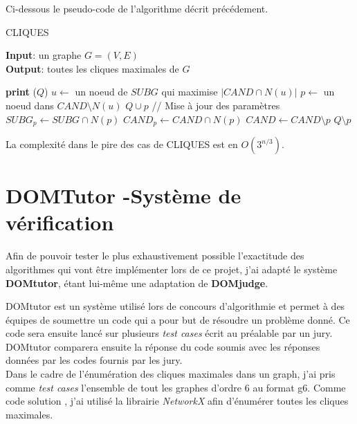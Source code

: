 \documentclass[a4paper, 12pt]{article}
\begin{document}
Ci-dessous le pseudo-code de l'algorithme décrit précédement.
\begin{algorithm}
  \caption{CLIQUES}
  \textbf{Input}: un graphe $G = (V,E)$\\
  \textbf{Output}: toutes les cliques maximales de $G$
  \begin{algorithmic}[1]
       
        \State \textbf{print} ($ Q $)
      \Else
        \State $u \gets$ un noeud de $SUBG$ qui maximise $|CAND \cap N(u)|$
          \State $p \gets$ un noeud dans $CAND \setminus N(u)$
          \State $ Q \cup p $ 
          \State // Mise à jour des paramètres
          \State $SUBG_p \gets SUBG \cap N(p)$
          \State $CAND_p \gets CAND \cap N(p)$
          \State {}
          \State $CAND \gets CAND \setminus {p}$
          \State $ Q \setminus p $ 
        \EndWhile
      \EndIf
    \EndProcedure
    \State {}
  \end{algorithmic}
\end{algorithm}

La complexité dans le pire des cas de CLIQUES est en $ O(3^{n/3}) $.

\section{DOMTutor -Système de vérification}

Afin de pouvoir tester le plus exhaustivement possible l'exactitude des algorithmes qui vont être implémenter lors de ce projet, j'ai adapté le système \textbf{DOMtutor}\cite{domtutor}, étant lui-même une adaptation de \textbf{DOMjudge}\cite{domjudge}.

DOMtutor est un système utilisé lors de concours d'algorithmie et permet à des équipes de soumettre un code qui a pour but de résoudre un problème donné. Ce code sera ensuite lancé sur plusieurs \textit{test cases} écrit au préalable par un jury. DOMtutor comparera ensuite la réponse du code soumis avec les réponses données par les codes fournis par les jury. \\

Dans le cadre de l'énumération des cliques maximales dans un graph, j'ai pris comme \textit{test cases} l'ensemble de tout les graphes d'ordre 6 au format g6. Comme code \og solution \og , j'ai utilisé la librairie \textit{NetworkX} afin d'énumérer toutes les cliques maximales.
\end{document}
